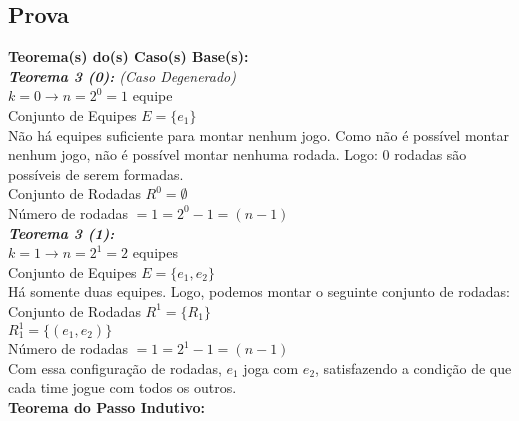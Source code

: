 \documentclass[twoside]{article}
\begin{document}
\begin{multicols}{2}
\subsection{ Prova }
\indent 

\textbf{Teorema(s) do(s) Caso(s) Base(s):}\\

\textit{\textbf{Teorema 3 (0):} (Caso Degenerado)}\\
$ k=0 \rightarrow n=2^0=1$ equipe\\
Conjunto de Equipes $E = \{e_1\}$\\
Não há equipes suficiente para montar nenhum jogo. Como não é possível montar nenhum jogo, não é possível montar nenhuma rodada. Logo: 0 rodadas são possíveis de serem formadas.\\
Conjunto de Rodadas $R^0 = \emptyset$\\
Número de rodadas $= 1 = 2^0-1 = (n-1)$\\

\textit{\textbf{Teorema 3 (1):}}\\
$ k=1 \rightarrow n=2^1=2$ equipes\\
Conjunto de Equipes $E = \{e_1,e_2\}$\\
Há somente duas equipes. Logo, podemos montar o seguinte conjunto de rodadas:\\
Conjunto de Rodadas $R^1 = \{R_1\}$\\
 $R^1_1 =\{(e_1,e_2)\}$\\
Número de rodadas $= 1 = 2^1-1 = (n-1)$\\
Com essa configuração de rodadas, $e_1$ joga com $e_2$, satisfazendo a condição de que cada time jogue com todos os outros.\\

\textbf{Teorema do Passo Indutivo:}\\


\end{multicols}
\end{document}
